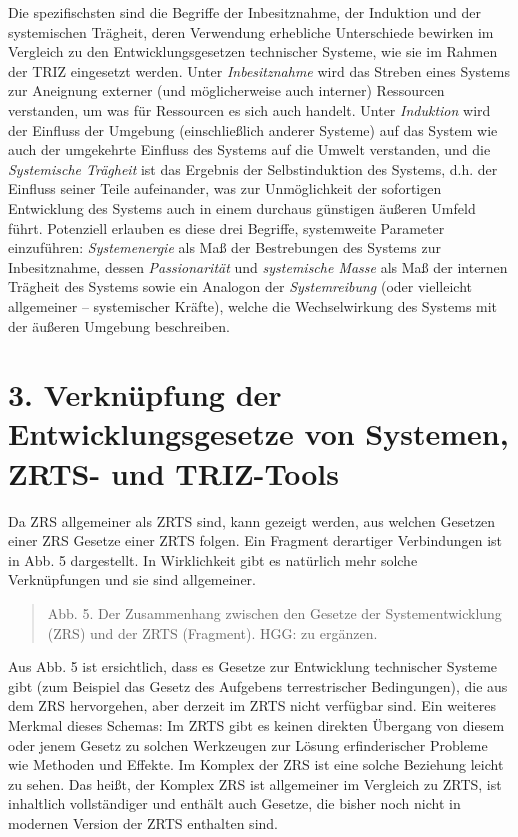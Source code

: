 \documentclass[11pt,a4paper]{article}
\begin{document}
Die spezifischsten sind die Begriffe der Inbesitznahme, der Induktion und der
systemischen Trägheit, deren Verwendung erhebliche Unterschiede bewirken im
Vergleich zu den Entwicklungsgesetzen technischer Systeme, wie sie im Rahmen
der TRIZ eingesetzt werden. Unter \emph{Inbesitznahme} wird das Streben eines
Systems zur Aneignung externer (und möglicherweise auch interner) Ressourcen
verstanden, um was für Ressourcen es sich auch handelt. Unter \emph{Induktion}
wird der Einfluss der Umgebung (einschließlich anderer Systeme) auf das System
wie auch der umgekehrte Einfluss des Systems auf die Umwelt verstanden, und
die \emph{Systemische Trägheit} ist das Ergebnis der Selbstinduktion des
Systems, d.h. der Einfluss seiner Teile aufeinander, was zur Unmöglichkeit der
sofortigen Entwicklung des Systems auch in einem durchaus günstigen äußeren
Umfeld führt. Potenziell erlauben es diese drei Begriffe, systemweite
Parameter einzuführen: \emph{Systemenergie} als Maß der Bestrebungen des
Systems zur Inbesitznahme, dessen \emph{Passionarität} und \emph{systemische
  Masse} als Maß der internen Trägheit des Systems sowie ein Analogon der
\emph{Systemreibung} (oder vielleicht allgemeiner -- systemischer Kräfte),
welche die Wechselwirkung des Systems mit der äußeren Umgebung beschreiben.

\section*{3. Verknüpfung der Entwicklungsgesetze von Systemen,\\ ZRTS- und
  TRIZ-Tools}

Da ZRS allgemeiner als ZRTS sind, kann gezeigt werden, aus welchen Gesetzen
einer ZRS Gesetze einer ZRTS folgen. Ein Fragment derartiger Verbindungen ist
in Abb. 5 dargestellt. In Wirklichkeit gibt es natürlich mehr solche
Verknüpfungen und sie sind allgemeiner.
\begin{quote}
  Abb. 5. Der Zusammenhang zwischen den Gesetze der Systementwicklung (ZRS)
  und der ZRTS (Fragment). HGG: zu ergänzen.
\end{quote}
Aus Abb. 5 ist ersichtlich, dass es Gesetze zur Entwicklung technischer
Systeme gibt (zum Beispiel das Gesetz des Aufgebens terrestrischer
Bedingungen), die aus dem ZRS hervorgehen, aber derzeit im ZRTS nicht
verfügbar sind. Ein weiteres Merkmal dieses Schemas: Im ZRTS gibt es keinen
direkten Übergang von diesem oder jenem Gesetz zu solchen Werkzeugen zur
Lösung erfinderischer Probleme wie Methoden und Effekte. Im Komplex der ZRS
ist eine solche Beziehung leicht zu sehen. Das heißt, der Komplex ZRS ist
allgemeiner im Vergleich zu ZRTS, ist inhaltlich vollständiger und enthält
auch Gesetze, die bisher noch nicht in modernen Version der ZRTS enthalten
sind.
\end{document}
